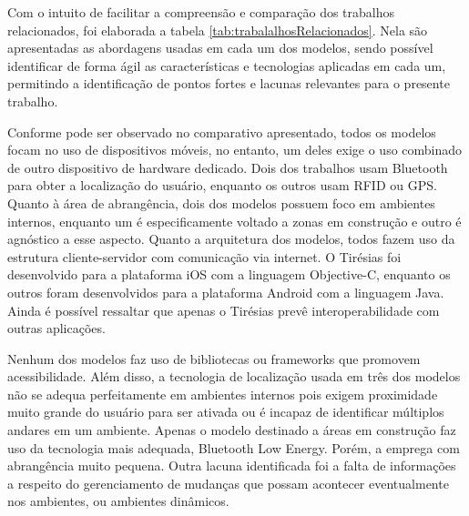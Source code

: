\documentclass[twoside,english,brazilian]{UNISINOSartigo}
\begin{document}
Com o intuito de facilitar a compreensão e comparação dos trabalhos relacionados, foi elaborada a tabela \ref{tab:trabalalhosRelacionados}. Nela são apresentadas as abordagens usadas em cada um dos modelos, sendo possível identificar de forma ágil as características e tecnologias aplicadas em cada um, permitindo a identificação de pontos fortes e lacunas relevantes para o presente trabalho.

Conforme pode ser observado no comparativo apresentado, todos os modelos focam no uso de dispositivos móveis, no entanto, um deles exige o uso combinado de outro dispositivo de hardware dedicado. Dois dos trabalhos usam Bluetooth para obter a localização do usuário, enquanto os outros usam RFID ou GPS. Quanto à área de abrangência, dois dos modelos possuem foco em ambientes internos, enquanto um é especificamente voltado a zonas em construção e outro é agnóstico a esse aspecto.
Quanto a arquitetura dos modelos, todos fazem uso da estrutura cliente-servidor com comunicação via internet. O Tirésias foi desenvolvido para a plataforma iOS com a linguagem Objective-C, enquanto os outros foram desenvolvidos para a plataforma Android com a linguagem Java. Ainda é possível ressaltar que apenas o Tirésias prevê interoperabilidade com outras aplicações.

Nenhum dos modelos faz uso de bibliotecas ou frameworks que promovem acessibilidade. Além disso, a tecnologia de localização usada em três dos modelos não se adequa perfeitamente em ambientes internos pois exigem proximidade muito grande do usuário para ser ativada ou é incapaz de identificar múltiplos andares em um ambiente. Apenas o modelo destinado a áreas em construção faz uso da tecnologia mais adequada, Bluetooth Low Energy. Porém, a emprega com abrangência muito pequena. Outra lacuna identificada foi a falta de informações a respeito do gerenciamento de mudanças que possam acontecer eventualmente nos ambientes, ou ambientes dinâmicos.
\end{document}
